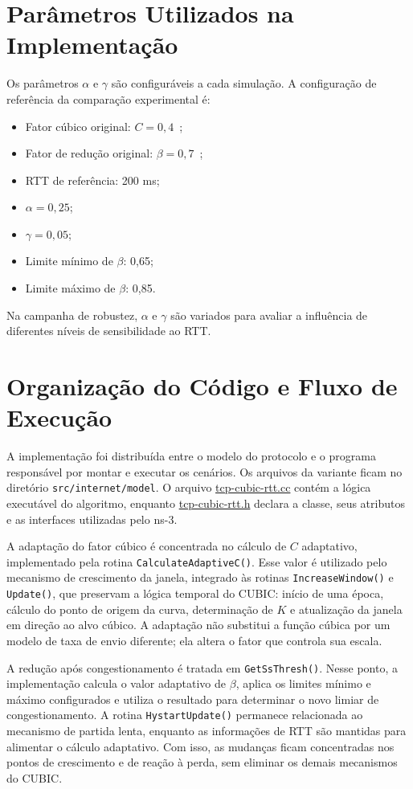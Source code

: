 \section{Parâmetros Utilizados na Implementação}

Os parâmetros $\alpha$ e $\gamma$ são configuráveis a cada simulação. A configuração de referência da comparação experimental é:

\begin{itemize}
    \item Fator cúbico original: $C=0{,}4$~\cite{rfc9438};
    \item Fator de redução original: $\beta=0{,}7$~\cite{rfc9438};
    \item RTT de referência: 200 ms;
    \item $\alpha=0{,}25$;
    \item $\gamma=0{,}05$;
    \item Limite mínimo de $\beta$: 0,65;
    \item Limite máximo de $\beta$: 0,85.
\end{itemize}

Na campanha de robustez, $\alpha$ e $\gamma$ são variados para avaliar a influência de diferentes níveis de sensibilidade ao RTT.

\section{Organização do Código e Fluxo de Execução}

A implementação foi distribuída entre o modelo do protocolo e o programa responsável por montar e executar os cenários. Os arquivos da variante ficam no diretório \texttt{src/internet/model}. O arquivo \url{tcp-cubic-rtt.cc} contém a lógica executável do algoritmo, enquanto \url{tcp-cubic-rtt.h} declara a classe, seus atributos e as interfaces utilizadas pelo ns-3.

A adaptação do fator cúbico é concentrada no cálculo de $C$ adaptativo, implementado pela rotina \texttt{CalculateAdaptiveC()}. Esse valor é utilizado pelo mecanismo de crescimento da janela, integrado às rotinas \texttt{IncreaseWindow()} e \texttt{Update()}, que preservam a lógica temporal do CUBIC: início de uma época, cálculo do ponto de origem da curva, determinação de $K$ e atualização da janela em direção ao alvo cúbico. A adaptação não substitui a função cúbica por um modelo de taxa de envio diferente; ela altera o fator que controla sua escala.

A redução após congestionamento é tratada em \texttt{GetSsThresh()}. Nesse ponto, a implementação calcula o valor adaptativo de $\beta$, aplica os limites mínimo e máximo configurados e utiliza o resultado para determinar o novo limiar de congestionamento. A rotina \texttt{HystartUpdate()} permanece relacionada ao mecanismo de partida lenta, enquanto as informações de RTT são mantidas para alimentar o cálculo adaptativo. Com isso, as mudanças ficam concentradas nos pontos de crescimento e de reação à perda, sem eliminar os demais mecanismos do CUBIC.

